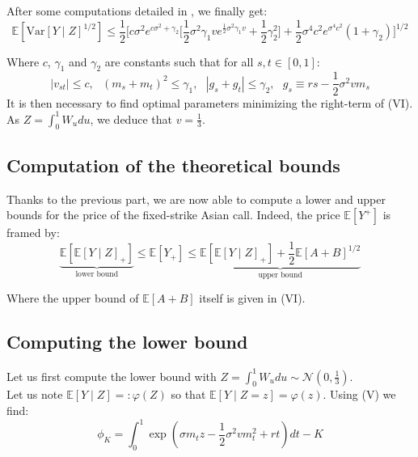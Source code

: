 \documentclass{article}
\begin{document}
After some computations detailed in \cite{Rogers}, we finally get:
\begin{equation}
    \mathbb{E}[\mathrm{Var}[Y\mid Z]^{1/2}]
    \leq \frac{1}{2}\Biggl[
    	c\sigma^{2}e^{c\sigma^{2}+\gamma_{2}}\biggl[
		\frac{1}{2}\sigma^{2}\gamma_{1}v e^{{\frac{1}{2}}\sigma^{2}\gamma_{1}v}
			+{\textstyle{\frac{1}{2}}}\gamma_{2}^{2}
		\biggr]+{\textstyle{\frac{1}{2}}}\sigma^{4}c^{2}e^{\sigma^{4}c^{2}}(1+\gamma_{2})
	\Biggr]^{1/2} \tag{VI}
\end{equation}

Where $c$, $\gamma_1$ and $\gamma_2$ are constants such that for all $s, t \in [0, 1]$:
\begin{equation}
    |v_{s t}|\leq c,\ \ \ (m_{s}+m_{t})^{2}\leq\gamma_{1},\ \ \ |g_{s}+g_{t}|\leq\gamma_{2} ,\ \ \ 
    g_s\equiv r s-\textstyle{\frac{1}{2}}\sigma^{2}v m_{s}
    \tag{VII}
\end{equation}
It is then necessary to find optimal parameters minimizing the right-term of (VI).
As $Z=\int_{0}^{1}W_u du$, we deduce that $v=\frac{1}{3}$.

\subsection{Computation of the theoretical bounds}

Thanks to the previous part, we are now able to compute a lower and upper bounds for the price of the
fixed-strike Asian call. Indeed, the price $\mathbb{E}[Y^{+}]$ is framed by:
\begin{equation}
    \underbrace{\mathbb{E}[\mathbb{E}[Y\mid Z]_{+}]}_{\text{lower bound}}
    \leqslant \mathbb{E}[Y_{+}]
    \leqslant \underbrace{\mathbb{E}[\mathbb{E}[Y\mid Z]_{+}] +
    	\frac{1}{2} \mathbb{E}[A+B]^{1/2}}_{\text{upper bound}}
    \tag{VIII}
\end{equation}

Where the upper bound of $\mathbb E[A+B]$ itself is given in (VI).

\subsection{Computing the lower bound}

Let us first compute the lower bound with
$Z=\int_{0}^{1}W_u du \sim \mathcal{N}(0,\frac{1}{3})$.
\\

Let us note $\mathbb{E}[Y\mid Z] =: \varphi(Z)$ so that $\mathbb{E}[Y\mid Z=z]=\varphi(z)$.
Using (V) we find:
\[
	\phi_{K}=\int_{0}^{1}\exp(\sigma m_t z-{\textstyle\frac{1}{2}}\sigma^{2}v m_{t}^{2}+r t)dt - K
\]
\end{document}
